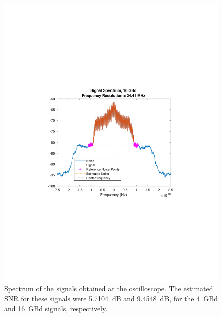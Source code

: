 \begin{refsection}
\begin{figure}[H]
\begin{minipage}{0.43\textwidth}
\subcaption{\label{fig:4GBdSpectrum}}
	\end{minipage}
\begin{minipage}{0.43\textwidth}
		\centering
	\includegraphics[clip, trim=4cm 8cm 4cm 8cm, width=1\textwidth]{./sdf/m_qam_system/figures/expResults/16GBdSpectrum.pdf}
		
	\subcaption{\label{fig:16GBdSpectrum}}
\end{minipage}
	\caption{Spectrum of the signals obtained at the oscilloscope. The estimated SNR for these signals were 5.7104~dB and 9.4548~dB, for the 4~GBd and 16~GBd signals, respectively.}
\end{figure}


\end{refsection}
